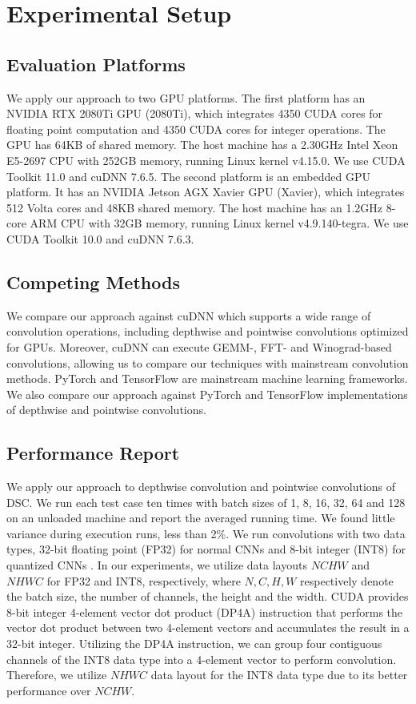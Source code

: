 

\section{Experimental Setup}

\subsection{Evaluation Platforms} We apply our approach to two GPU platforms.
The first platform has an NVIDIA RTX 2080Ti GPU (2080Ti), which integrates 4350 CUDA cores for floating point computation and 4350 CUDA
cores for integer operations. The GPU has 64KB of shared memory. The host machine has a 2.30GHz Intel Xeon E5-2697 CPU with 252GB memory,
running Linux kernel v4.15.0. We use CUDA Toolkit 11.0 and cuDNN 7.6.5. The second platform is an embedded GPU platform. It has an NVIDIA
Jetson AGX Xavier GPU (Xavier), which integrates 512 Volta cores and 48KB shared memory. The host machine has an 1.2GHz 8-core ARM CPU with
32GB memory, running Linux kernel v4.9.140-tegra. We use CUDA Toolkit 10.0 and cuDNN 7.6.3.


\subsection{Competing Methods} We compare our approach against cuDNN \cite{ChetlurWVCTCS14} which supports a wide range of convolution operations,
 including depthwise and pointwise convolutions optimized for GPUs.  Moreover, cuDNN can execute GEMM-, FFT- and Winograd-based convolutions, allowing
 us to compare our techniques with mainstream convolution methods. PyTorch \cite{paszke2019pytorch} and TensorFlow \cite{abadi2016tensorflow} are mainstream machine learning frameworks. We also compare our approach against PyTorch and TensorFlow implementations of depthwise and pointwise convolutions.



\subsection{Performance Report}
We apply our approach to depthwise convolution and pointwise convolutions of DSC.  We run each test case ten times with batch sizes of 1, 8,
16, 32, 64 and 128 on an unloaded machine and report the averaged running time. We found little variance during execution runs, less than
2\%. We run convolutions with two data types, 32-bit floating point (FP32) for normal CNNs and 8-bit integer (INT8) for quantized CNNs
\cite{nagel2019data}. In our experiments, we utilize data layouts $NCHW$ and $NHWC$ for FP32 and INT8, respectively, where $N, C, H, W$
respectively denote the batch size, the number of channels, the height and the width. CUDA \cite{cudatoolkit} provides 8-bit integer
4-element vector dot product (DP4A) instruction that performs the vector dot product between two 4-element vectors and accumulates the
result in a 32-bit integer. Utilizing the DP4A instruction, we can group four contiguous channels of the INT8 data type into a 4-element
vector to perform convolution. Therefore, we utilize $NHWC$ data layout for the INT8 data type due to its better performance over $NCHW$.

